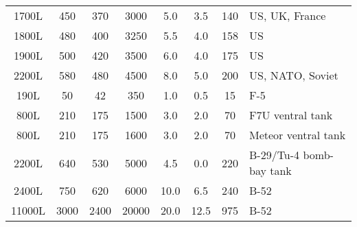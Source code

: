 \begin{twocolumntablefloat}
\begin{twocolumntable}
{\begin{tabular}{cccccccl}
\phantom{0}1700L&\phantom{0}450&\phantom{0}370&\phantom{0}3000&\phantom{0}5.0&\phantom{0}3.5&\phantom{}140&US, UK, France\\
\phantom{0}1800L&\phantom{0}480&\phantom{0}400&\phantom{0}3250&\phantom{0}5.5&\phantom{0}4.0&\phantom{}158&US\\
\phantom{0}1900L&\phantom{0}500&\phantom{0}420&\phantom{0}3500&\phantom{0}6.0&\phantom{0}4.0&\phantom{}175&US\\
\phantom{0}2200L&\phantom{0}580&\phantom{0}480&\phantom{0}4500&\phantom{0}8.0&\phantom{0}5.0&\phantom{}200&US, NATO, Soviet\\
\midrule
\phantom{00}190L&\phantom{00}50&\phantom{00}42&\phantom{00}350&\phantom{0}1.0&\phantom{0}0.5&\phantom{0}15&F-5\\
\phantom{00}800L&\phantom{0}210&\phantom{0}175&\phantom{0}1500&\phantom{0}3.0&\phantom{0}2.0&\phantom{0}70&F7U ventral tank\\
\phantom{00}800L&\phantom{0}210&\phantom{0}175&\phantom{0}1600&\phantom{0}3.0&\phantom{0}2.0&\phantom{0}70&Meteor ventral tank\\
\phantom{0}2200L&\phantom{0}640&\phantom{0}530&\phantom{0}5000&\phantom{0}4.5&\phantom{0}0.0&\phantom{0}220&B-29/Tu-4 bomb-bay tank\\
\phantom{0}2400L&\phantom{0}750&\phantom{0}620&\phantom{0}6000&\phantom{}10.0&\phantom{0}6.5&\phantom{0}240&B-52\\
\phantom{}11000L&\phantom{}3000&\phantom{}2400&\phantom{}20000&\phantom{}20.0&12.5&\phantom{0}975&B-52\\
\bottomrule
\end{tabular}

}
\end{twocolumntable}
\end{twocolumntablefloat}
